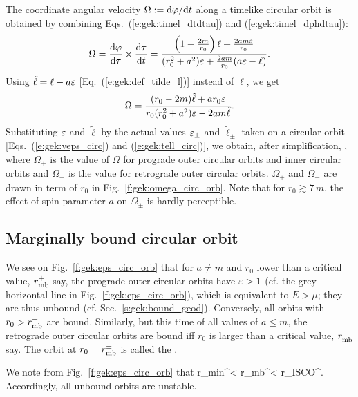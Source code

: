 The coordinate angular velocity $\Omega := \mathrm{d}\varphi/\mathrm{d} t$ along a timelike circular orbit is
obtained by combining Eqs.~(\ref{e:gek:timel_dtdtau}) and (\ref{e:gek:timel_dphdtau}):
\[
    \Omega = \frac{\mathrm{d}\varphi}{\mathrm{d}\tau} \times \frac{\mathrm{d}\tau}{\mathrm{d} t}
        = \frac{ \left( 1 - \frac{2m}{r_0} \right) \ell
    + \frac{2 am \varepsilon}{r_0} }{(r_0^2 + a^2) \varepsilon + \frac{2 a m}{r_0} (a\varepsilon - \ell)} .
\]
Using $\tilde{\ell} = \ell - a\varepsilon$ [Eq.~(\ref{e:gek:def_tilde_l})] instead of $\ell$, we
get
\[
    \Omega = \frac{(r_0 - 2m) \tilde{\ell} + a r_0 \varepsilon}{r_0(r_0^2 + a^2) \varepsilon
    - 2 a m \tilde{\ell}} .
\]
Substituting $\varepsilon$ and $\tilde{\ell}$ by the actual values $\varepsilon_\pm$
and $\tilde{\ell}_\pm$ taken on a circular orbit [Eqs.~(\ref{e:gek:veps_circ})
and (\ref{e:gek:tell_circ})], we obtain, after simplification,
\be \label{e:gek:Omega_circ}
     ,
\ee
where $\Omega_+$ is the value of $\Omega$ for prograde outer circular orbits
and inner circular orbits and $\Omega_-$ is the value for retrograde
outer circular orbits. $\Omega_+$ and $\Omega_-$ are drawn in term of $r_0$
in Fig.~\ref{f:gek:omega_circ_orb}. Note that for $r_0 \gtrsim 7\, m$,
the effect of spin parameter $a$ on $\Omega_\pm$ is hardly perceptible.

\subsection{Marginally bound circular orbit}

We see on Fig.~\ref{f:gek:eps_circ_orb} that for $a \neq m$ and $r_0$ lower than a critical
value, $r_{\rm mb}^+$ say, the prograde outer circular orbits have $\varepsilon > 1$
(cf. the grey horizontal line in Fig.~\ref{f:gek:eps_circ_orb}), which is equivalent to
$E>\mu$; they are thus unbound (cf. Sec.~\ref{s:gek:bound_geod}). Conversely, all
orbits with $r_0 > r_{\rm mb}^+$ are bound.
Similarly, but this time of all values of $a\leq m$,
the retrograde outer circular orbits are bound iff $r_0$ is larger than
a critical value, $r_{\rm mb}^-$ say. The orbit at $r_0 = r_{\rm mb}^\pm$ is
called the .

We note from Fig.~\ref{f:gek:eps_circ_orb} that
\be
    r_{\rm min}^\pm < r_{\rm mb}^\pm < r_{\rm ISCO}^\pm .
\ee
Accordingly, all unbound orbits are unstable.

